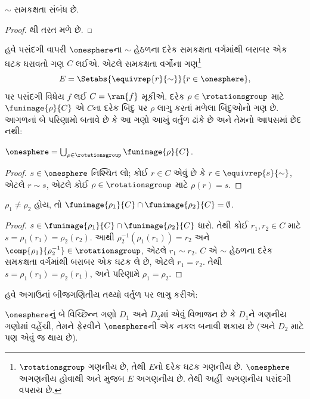 \begin{lem}
$\sim$ સમકક્ષતા સંબંધ છે.
\end{lem}

\begin{proof}
થી તરત મળે છે.
\end{proof}

હવે પસંદગી વાપરી $\onesphere$ના
$\sim$ હેઠળના દરેક સમકક્ષતા વર્ગમાંથી
બરાબર એક ઘટક ધરાવતો ગણ $C$ લઈએ.
એટલે સમકક્ષતા વર્ગોના
ગણ\footnote{$\rotationsgroup$ ગણનીય છે,
તેથી $E$નો દરેક ઘટક
ગણનીય છે.
$\onesphere$ અગણનીય હોવાથી
 અને
મુજબ $E$ અગણનીય છે. તેથી અહીં
\emph{અ}ગણનીય પસંદગી વપરાય છે.}
\[
	E = \Setabs{\equivrep{r}{\sim}}{r \in \onesphere},
\]
પર પસંદગી વિધેય $f$ લઈ
$C = \ran{f}$ મૂકીએ.
દરેક $\rho \in \rotationsgroup$
માટે $\funimage{\rho}{C}$ એ $C$ના
દરેક બિંદુ પર $\rho$ લાગુ કરતાં
મળેલા બિંદુઓનો ગણ છે. આગળનાં
બે પરિણામો બતાવે છે કે આ ગણો
આખું વર્તુળ ઢાંકે છે અને તેમનો
આપસમાં છેદ નથી:

\begin{lem}
$\onesphere = \bigcup_{\rho \in \rotationsgroup} \funimage{\rho}{C}$.
\end{lem}

\begin{proof}
$s \in \onesphere$ નિશ્ચિત લો;
કોઈ $r \in C$ એવું છે કે
$r \in \equivrep{s}{\sim}$,
એટલે $r \sim s$, એટલે કોઈ
$\rho \in \rotationsgroup$ માટે
$\rho(r) = s$.
\end{proof}

\begin{lem}
$\rho_1 \neq \rho_2$ હોય, તો
$\funimage{\rho_1}{C} \cap \funimage{\rho_2}{C} = \emptyset$.
\end{lem}

\begin{proof}
$s \in \funimage{\rho_{1}}{C} \cap
\funimage{\rho_{2}}{C}$ ધારો.
તેથી કોઈ $r_{1}, r_{2} \in C$ માટે
$s = \rho_{1}(r_{1}) = \rho_{2}(r_{2})$.
આથી $\rho^{-1}_2(\rho_1(r_1)) = r_2$
અને $\comp{\rho_1}{\rho^{-1}_2} \in
\rotationsgroup$, એટલે $r_{1} \sim
r_{2}$. $C$ એ $\sim$ હેઠળના
દરેક સમકક્ષતા વર્ગમાંથી
બરાબર એક ઘટક લે છે, એટલે
$r_1 = r_2$. તેથી
$s = \rho_1(r_1) = \rho_2(r_1)$,
અને પરિણામે $\rho_1 = \rho_2$.
\end{proof}

હવે અગાઉનાં બીજગણિતીય તથ્યો
વર્તુળ પર લાગુ કરીએ:

\begin{lem}
$\onesphere$નું બે વિચ્છિન્ન ગણો
$D_{1}$ અને $D_{2}$માં એવું
વિભાજન છે કે $D_{1}$ને ગણનીય
ગણોમાં વહેંચી, તેમને ફેરવીને
$\onesphere$ની એક નકલ બનાવી
શકાય છે (અને $D_{2}$ માટે પણ
એવું જ થાય છે).
\end{lem}

